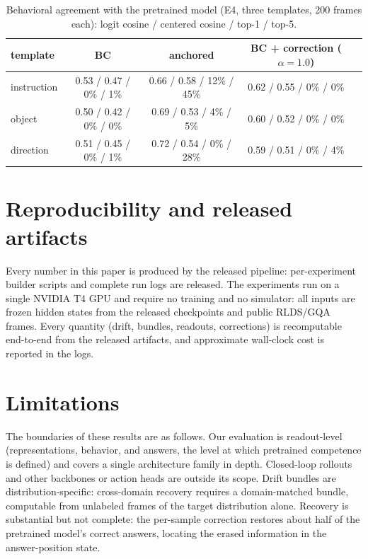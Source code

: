 \documentclass{article}
\begin{document}
\begin{table}[H]
	\centering
	\caption{Behavioral agreement with the pretrained model (E4, three templates,
	200 frames each): logit cosine / centered cosine / top-1 / top-5.}
	\label{tab:app_e4}
	\footnotesize
	\begin{tabular}{lcccc}
		\toprule
		template & BC & anchored & BC + correction ($\alpha{=}1.0$) \\
		\midrule
		instruction & 0.53 / 0.47 / 0\% / 1\% & 0.66 / 0.58 / 12\% / 45\% & 0.62 / 0.55 / 0\% / 0\% \\
		object      & 0.50 / 0.42 / 0\% / 0\% & 0.69 / 0.53 / 4\% / 5\%  & 0.60 / 0.52 / 0\% / 0\% \\
		direction   & 0.51 / 0.45 / 0\% / 1\% & 0.72 / 0.54 / 0\% / 28\% & 0.59 / 0.51 / 0\% / 4\% \\
		\bottomrule
	\end{tabular}
\end{table}

\section{Reproducibility and released artifacts}
\label{app:repro}

Every number in this paper is produced by the released pipeline: per-experiment builder
scripts and complete run logs are released. The experiments run on a single NVIDIA T4 GPU
and require no training and no simulator: all inputs are frozen hidden states from the
released checkpoints and public RLDS/GQA frames. Every quantity (drift, bundles, readouts,
corrections) is recomputable end-to-end from the released artifacts, and approximate
wall-clock cost is reported in the logs.

\section{Limitations}
\label{app:limitations}

The boundaries of these results are as follows. Our evaluation is readout-level
(representations, behavior, and answers, the level at which pretrained competence is
defined) and covers a single architecture family in depth. Closed-loop rollouts and other
backbones or action heads are outside its scope. Drift bundles are distribution-specific:
cross-domain recovery requires a domain-matched bundle, computable from unlabeled frames of
the target distribution alone. Recovery is substantial but not complete: the per-sample
correction restores about half of the pretrained model's correct answers, locating the erased
information in the answer-position state.
\end{document}
